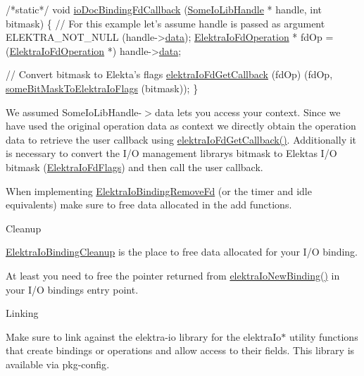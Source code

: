 \begin{DoxyCodeInclude}
\textcolor{comment}{/*static*/} \textcolor{keywordtype}{void} \hyperlink{io__doc_8c_a1fce91400d38bed917cdb6dfc1bc1cf6}{ioDocBindingFdCallback} (\hyperlink{structSomeIoLibHandle}{SomeIoLibHandle} * handle, \textcolor{keywordtype}{int} 
      bitmask)
\{
        \textcolor{comment}{// For this example let's assume handle is passed as argument}
        ELEKTRA\_NOT\_NULL (handle->\hyperlink{structSomeIoLibHandle_a3268457567f3ec3094c96c4bdf8424e5}{data});
        \hyperlink{kdbio_8h_af7fbb1df168155ef4bf0b8cd2dd1b0ff}{ElektraIoFdOperation} * fdOp = (\hyperlink{kdbio_8h_af7fbb1df168155ef4bf0b8cd2dd1b0ff}{ElektraIoFdOperation} *) 
      handle->\hyperlink{structSomeIoLibHandle_a3268457567f3ec3094c96c4bdf8424e5}{data};

        \textcolor{comment}{// Convert bitmask to Elekta's flags}
        \hyperlink{io_8c_a885381fdd55cf957af1d65db7522899a}{elektraIoFdGetCallback} (fdOp) (fdOp, 
      \hyperlink{io__doc_8c_a3765fc3222ed7bd10910575f3fa700be}{someBitMaskToElektraIoFlags} (bitmask));
\}
\end{DoxyCodeInclude}
 We assumed {\ttfamily Some\+Io\+Lib\+Handle-\/$>$data} let\textquotesingle{}s you access your context. Since we have used the original operation data as context we directly obtain the operation data to retrieve the user callback using \hyperlink{io_8c_a885381fdd55cf957af1d65db7522899a}{elektra\+Io\+Fd\+Get\+Callback()}. Additionally it is necessary to convert the I/O management library\textquotesingle{}s bitmask to Elekta\textquotesingle{}s I/O bitmask (\hyperlink{kdbio_8h_ac46f42188abb1fa28c3116b8cb755825}{Elektra\+Io\+Fd\+Flags}) and then call the user callback.

When implementing \hyperlink{kdbio_8h_af1d03ff367130892ec3d1f4788eb8277}{Elektra\+Io\+Binding\+Remove\+Fd} (or the timer and idle equivalents) make sure to free data allocated in the add functions.

\begin{DoxyParagraph}{Cleanup}

\end{DoxyParagraph}
\hyperlink{kdbio_8h_a08d3ce531bbd1c5acedbdb9822b24d6d}{Elektra\+Io\+Binding\+Cleanup} is the place to free data allocated for your I/O binding.

At least you need to free the pointer returned from \hyperlink{io_8c_a8dd14e7bd04afb798ea30ff8feb5f3a6}{elektra\+Io\+New\+Binding()} in your I/O binding\textquotesingle{}s entry point.

\begin{DoxyParagraph}{Linking}

\end{DoxyParagraph}
Make sure to link against the {\ttfamily elektra-\/io} library for the {\ttfamily elektra\+Io$\ast$} utility functions that create bindings or operations and allow access to their fields. This library is available via {\ttfamily pkg-\/config}.

